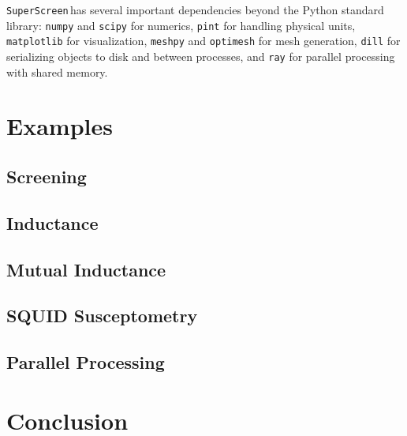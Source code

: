\documentclass{article}
\newcommand{\SuperScreen}{\texttt{SuperScreen}\,}
\begin{document}
\SuperScreen has several important dependencies beyond the Python standard library: \texttt{numpy} and \texttt{scipy} for numerics, \texttt{pint} for handling physical units, \texttt{matplotlib} for visualization, \texttt{meshpy} and \texttt{optimesh} for mesh generation, \texttt{dill} for serializing objects to disk and between processes, and \texttt{ray} for parallel processing with shared memory.

\section{Examples}
\label{section:examples}

\subsection{Screening}
\label{section:example:screening}

\subsection{Inductance}
\label{section:examples:inductance}

\subsection{Mutual Inductance}
\label{section:examples:mutual-inductance}

\subsection{SQUID Susceptometry}
\label{section:examples:susceptometry}

\subsection{Parallel Processing}
\label{section:examples:parallel}


\section{Conclusion}
\label{section:conlusion}
\end{document}
